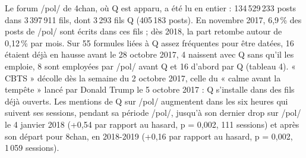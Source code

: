 \documentclass[11pt,a4paper]{article}
\begin{document}
Le forum /pol/ de 4chan, où Q est apparu, a été lu en entier \parencite{papasavva2020raiders} : 134 529 233 posts dans 3 397 911 fils, dont 3 293 fils Q (405 183 posts). En novembre 2017, 6,9 \% des posts de /pol/ sont écrits dans ces fils ; dès 2018, la part retombe autour de 0,12 \% par mois. Sur 55 formules liées à Q assez fréquentes pour être datées, 16 étaient déjà en hausse avant le 28 octobre 2017, 4 naissent avec Q sans qu'il les emploie, 8 sont employées par /pol/ avant Q et 16 d'abord par Q (tableau 4). « CBTS » décolle dès la semaine du 2 octobre 2017, celle du « calme avant la tempête » lancé par Donald Trump le 5 octobre 2017 : Q s'installe dans des fils déjà ouverts. Les mentions de Q sur /pol/ augmentent dans les six heures qui suivent ses sessions, pendant sa période /pol/, jusqu'à son dernier drop sur /pol/ le 4 janvier 2018 (+0,54 par rapport au hasard, p = 0,002, 111 sessions) et après son départ pour 8chan, en 2018-2019 (+0,16 par rapport au hasard, p = 0,002, 1 059 sessions).
\end{document}
